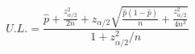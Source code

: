 

\[
U. L. = \frac{\hat{p} + \frac{z_{\alpha/2}^{2}}{2n} + z_{\alpha/2}\sqrt{\frac{\hat{p}(1-\hat{p})}{n} + \frac{z_{\alpha/2}^{2}}{4n^2}}} {1 + z_{\alpha/2}^{2}/n}
\]


